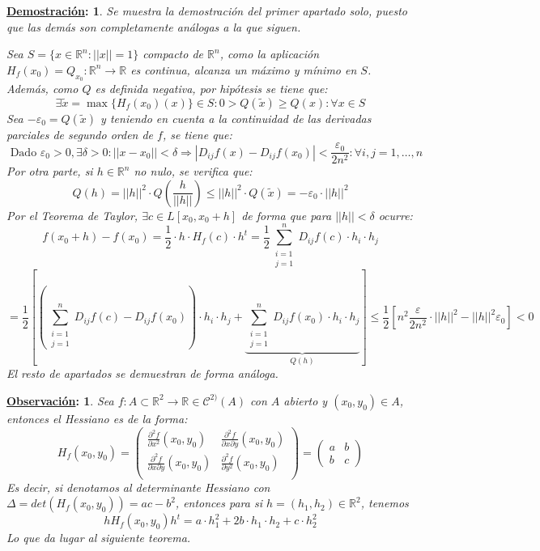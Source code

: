 \documentclass[10pt,a4paper,openright]{book}
\theoremstyle{break}
\newtheorem*{demo}{\underline{Demostración}:}
\newtheorem*{obs}{\underline{Observación}:}
\begin{document}
\begin{demo}
Se muestra la demostración del primer apartado solo, puesto que las demás son completamente análogas a la que siguen.

Sea $S = \{x \in \mathbb{R}^n : || x || = 1\}$ compacto de $\mathbb{R}^n$, como la aplicación $H_f (x_0) = Q_{x_0} : \mathbb{R}^n \to \mathbb{R}$ es continua, alcanza un máximo y mínimo en $S$. Además, como $Q$ es definida negativa, por hipótesis se tiene que:
$$\exists \tilde{x}=\max\{H_f(x_0)(x)\} \in S : 0 > Q(\tilde{x}) \geq Q(x) : \forall x \in S$$
Sea $-\varepsilon_0 = Q(\tilde{x})$ y teniendo en cuenta a la continuidad de las derivadas parciales de segundo orden de $f$, se tiene que: 
$$\mbox{ Dado } \varepsilon_0 > 0, \exists \delta > 0 : || x - x_0 || < \delta \Rightarrow \left| D_{ij} f(x) - D_{ij} f(x_0) \right| < \frac{\varepsilon_0}{2n^2} : \forall i,j = 1, \ldots, n$$
Por otra parte, si $h \in \mathbb{R}^n$ no nulo, se verifica que:
$$Q(h)= || h||^2 \cdot Q\left(\frac{h}{||h||}\right) \leq ||h||^2 \cdot  Q(\tilde{x}) = -\varepsilon_0 \cdot ||h||^2$$
Por el Teorema de Taylor, $\exists c \in L[x_0, x_0 + h]$ de forma que para $||h|| < \delta$ ocurre:
$$f(x_0 + h) - f(x_0) = \frac{1}{2} \cdot h \cdot H_f(c) \cdot h^t = \frac{1}{2} \sum_{\substack{i = 1 \\ j = 1}}^{n} D_{ij} f(c) \cdot h_i \cdot h_j $$
$$= \frac{1}{2} \left[ \left(\sum_{\substack{i = 1 \\ j = 1}}^{n} D_{ij} f(c) - D_{ij} f(x_0)  \right) \cdot h_i \cdot h_j + \underbrace{\sum_{\substack{i = 1 \\ j = 1}}^{n} D_{ij} f(x_0) \cdot h_i \cdot h_j}_{Q(h)} \right] \leq \frac{1}{2} \left[ n^2 \frac{\varepsilon}{2n^2} \cdot ||h||^2 - ||h||^2 \varepsilon_0 \right] < 0$$
El resto de apartados se demuestran de forma análoga.
\end{demo}

\begin{obs}
Sea $f : A \subset \mathbb{R}^2 \to \mathbb{R}\in \mathcal{C}^{2)}(A)$ con $A$ abierto y $(x_0, y_0) \in A$, entonces el Hessiano es de la forma:
$$H_f (x_0, y_0) = \begin{pmatrix} \frac{\partial^2 f}{\partial x^2} (x_0, y_0) & \frac{\partial^2 f}{\partial x \partial y} (x_0, y_0) \\ \frac{\partial^2 f}{\partial x \partial y} (x_0, y_0) & \frac{\partial^2 f}{\partial y^2} (x_0, y_0) \\ \end{pmatrix} = \begin{pmatrix} a & b \\ b & c \end{pmatrix}$$
Es decir, si denotamos al determinante Hessiano con $\Delta = det(H_f (x_0, y_0)) = ac - b^2$, entonces para si $h = (h_1, h_2) \in \mathbb{R}^2$, tenemos
$$h H_f (x_0, y_0) h^t = a \cdot h_1^2 + 2 b \cdot h_1 \cdot h_2 + c \cdot h_2^2$$
Lo que da lugar al siguiente teorema.
\end{obs}
\end{document}
